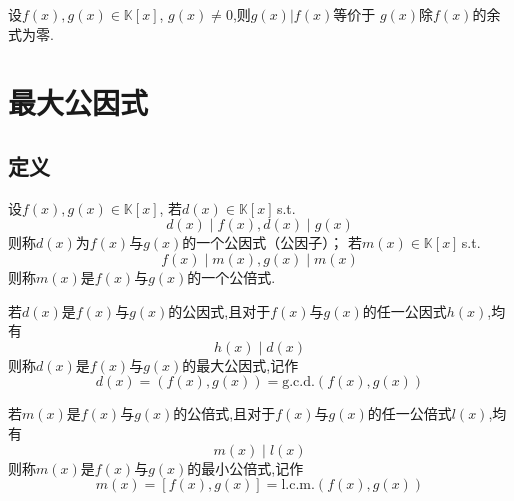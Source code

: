 \begin{green}
\begin{corollary}[整除与带余除法]\label{cor:整除与带余除法}
    设$f\left(x\right),g\left(x\right)\in \mathbb{K}\left[x\right]$,
    $g\left(x\right)\neq 0$,则$g\left(x\right)|f\left(x\right)$等价于
    $g\left(x\right)$除$f\left(x\right)$的余式为零.
\end{corollary}
\end{green}
\newpage
\section{最大公因式}
\subsection{定义}
\begin{formal}
\begin{definition}[公因式与公倍式]\label{def:公因式与公倍式}
    设$f\left(x\right),g\left(x\right)\in\mathbb{K}\left[x\right]$,
    若$d\left(x\right)\in\mathbb{K}\left[x\right]$\,\textup{s.t.}
    \[
    d\left(x\right)\mid f\left(x\right),d\left(x\right)\mid g\left(x\right)
    \]
    则称$d\left(x\right)$为$f\left(x\right)$与$g\left(x\right)$的一个公因式（公因子）；
    若$m\left(x\right)\in\mathbb{K}\left[x\right]$\,\textup{s.t.}
    \[
    f\left(x\right)\mid m\left(x\right),g\left(x\right)\mid m\left(x\right)
    \]
    则称$m\left(x\right)$是$f\left(x\right)$与$g\left(x\right)$的一个公倍式.
\end{definition}
\end{formal}
\begin{formal}
\begin{definition}[最大公因式与最小公倍式]
    若$d\left(x\right)$是$f\left(x\right)$与$g\left(x\right)$的公因式,且对于$f\left(x\right)$与$g\left(x\right)$的任一公因式$h\left(x\right)$,均有
    \[
    h\left(x\right)\mid d\left(x\right)
    \]
    则称$d\left(x\right)$是$f\left(x\right)$与$g\left(x\right)$的最大公因式,记作
    \[
    d\left(x\right)=\left(f\left(x\right),g\left(x\right)\right)=\mathrm{g.c.d.}\left(f\left(x\right),g\left(x\right)\right)
    \]

    若$m\left(x\right)$是$f\left(x\right)$与$g\left(x\right)$的公倍式,且对于$f\left(x\right)$与$g\left(x\right)$的任一公倍式$l\left(x\right)$,均有
    \[
    m\left(x\right)\mid l\left(x\right)
    \]
    则称$m\left(x\right)$是$f\left(x\right)$与$g\left(x\right)$的最小公倍式,记作
    \[
    m\left(x\right)=\left[f\left(x\right),g\left(x\right)\right]=\mathrm{l.c.m.}\left(f\left(x\right),g\left(x\right)\right)
    \]
\end{definition}
\end{formal}
